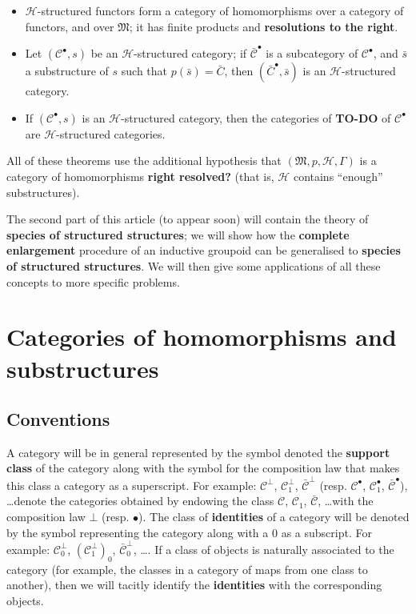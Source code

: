 \documentclass{article}
\newcommand{\todo}{{\color{purple}\textbf{TO-DO }}}
\newcommand{\unsure}[1]{{\color{purple}\textbf{#1}}}
\newcommand{\CC}{\mathcal{C}}
\newcommand{\HH}{\mathcal{H}}
\newcommand{\MM}{\mathfrak{M}}
\newcommand{\dotc}{{\mathbin{\bullet}}}
\newcommand{\botc}{{\mathbin{\bot}}}
\begin{document}
\begin{itemize}
  \item $\HH$-structured functors form a category of homomorphisms over a category of functors, and over $\MM$;
    it has finite products and \unsure{resolutions to the right}.
  \item Let $(\CC^\dotc,s)$ be an $\HH$-structured category;
    if $\bar{\CC}^\dotc$ is a subcategory of $\CC^\dotc$, and $\bar{s}$ a substructure of $s$ such that $p(\bar{s})=\bar{C}$, then $(\bar{C}^\dotc,\bar{s})$ is an $\HH$-structured category.
  \item If $(\CC^\dotc,s)$ is an $\HH$-structured category, then the categories of \todo of $\CC^\dotc$ are $\HH$-structured categories.
\end{itemize}

All of these theorems use the additional hypothesis that $(\MM,p,\HH,\Gamma)$ is a category of homomorphisms \unsure{right resolved?} (that is, $\HH$ contains ``enough'' substructures).

The second part of this article (to appear soon) will contain the theory of \unsure{species of structured structures};
we will show how the \unsure{complete enlargement} procedure of an inductive groupoid can be generalised to \unsure{species of structured structures}.
We will then give some applications of all these concepts to more specific problems.



\section{Categories of homomorphisms and substructures}

\subsection{Conventions}

A category will be in general represented by the symbol denoted the \unsure{support class} of the category along with the symbol for the composition law that makes this class a category as a superscript.
For example: $\CC^\botc$, $\CC_1^\botc$, $\bar{\CC}^\botc$ (resp. $\CC^\dotc$, $\CC_1^\dotc$, $\bar{\CC}^\dotc$), \ldots denote the categories obtained by endowing the class $\CC$, $\CC_1$, $\bar{\CC}$, \ldots with the composition law $\botc$ (resp. $\dotc$).
The class of \unsure{identities} of a category will be denoted by the symbol representing the category along with a $0$ as a subscript.
For example: $\CC_0^\botc$, $(\CC_1^\botc)_0$, $\bar{\CC}_0^\botc$, \ldots.
If a class of objects is naturally associated to the category (for example, the classes in a category of maps from one class to another), then we will tacitly identify the \unsure{identities} with the corresponding objects.
\end{document}
